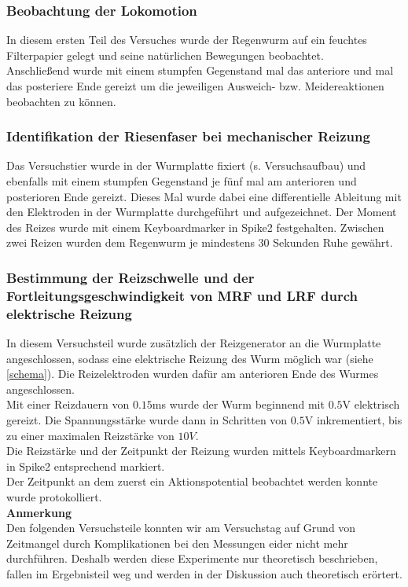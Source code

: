 \documentclass[11pt]{article}
\begin{document}
\subsubsection{Beobachtung der Lokomotion}
In diesem ersten Teil des Versuches wurde der Regenwurm auf ein feuchtes Filterpapier gelegt und seine natürlichen Bewegungen beobachtet.\\
Anschließend wurde mit einem stumpfen Gegenstand mal das anteriore und mal das posteriere Ende gereizt um die jeweiligen Ausweich- bzw. Meidereaktionen beobachten zu können. 

\subsubsection{Identifikation der Riesenfaser bei mechanischer Reizung}
Das Versuchstier wurde in der Wurmplatte fixiert (s. Versuchsaufbau) und ebenfalls mit einem stumpfen Gegenstand je fünf mal am anterioren und posterioren Ende gereizt. Dieses Mal wurde dabei eine differentielle Ableitung mit den Elektroden in der Wurmplatte durchgeführt und aufgezeichnet. Der Moment des Reizes wurde mit einem Keyboardmarker in Spike2 festgehalten. Zwischen zwei Reizen wurden dem Regenwurm je mindestens 30 Sekunden Ruhe gewährt.

\subsubsection{Bestimmung der Reizschwelle und der Fortleitungsgeschwindigkeit von MRF und LRF durch elektrische Reizung}
In diesem Versuchsteil wurde zusätzlich der Reizgenerator an die Wurmplatte angeschlossen, sodass eine elektrische Reizung des Wurm möglich war (siehe \ref{schema}). Die Reizelektroden wurden dafür am anterioren Ende des Wurmes angeschlossen. \\
Mit einer Reizdauern von $0.15$ms wurde der Wurm beginnend mit $0.5$V elektrisch gereizt.  Die Spannungsstärke wurde dann in Schritten von $0.5$V inkrementiert, bis zu einer maximalen Reizstärke von $10V$. \\
Die Reizstärke und der Zeitpunkt der Reizung wurden mittels Keyboardmarkern in Spike2 entsprechend markiert. \\
Der Zeitpunkt an dem zuerst ein Aktionspotential beobachtet werden konnte wurde protokolliert. \\


\textbf{Anmerkung}\\
Den folgenden Versuchsteile konnten wir am Versuchstag auf Grund von Zeitmangel durch Komplikationen bei den Messungen eider nicht mehr durchführen. Deshalb werden diese Experimente nur theoretisch beschrieben, fallen im Ergebnisteil weg und werden in der Diskussion auch theoretisch erörtert. 
\end{document}
